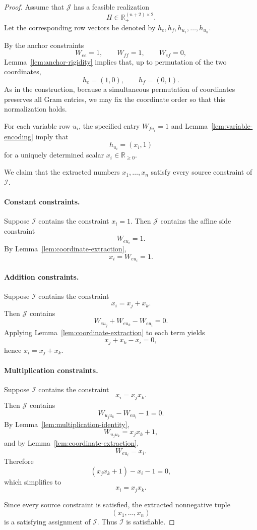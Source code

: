 \documentclass[11pt]{article}
\begin{document}
\begin{proof}
Assume that \(\mathcal{J}\) has a feasible realization
\[
H \in \mathbb{R}_+^{(n+2)\times 2}.
\]
Let the corresponding row vectors be denoted by
\(h_e,h_f,h_{u_1},\dots,h_{u_n}\).

By the anchor constraints
\[
W_{ee}=1,\qquad W_{ff}=1,\qquad W_{ef}=0,
\]
Lemma~\ref{lem:anchor-rigidity} implies that, up to permutation of the two
coordinates,
\[
h_e=(1,0),\qquad h_f=(0,1).
\]
As in the construction, because a simultaneous permutation of coordinates
preserves all Gram entries, we may fix the coordinate order so that this
normalization holds.

For each variable row \(u_i\), the specified entry \(W_{f u_i}=1\) and
Lemma~\ref{lem:variable-encoding} imply that
\[
h_{u_i}=(x_i,1)
\]
for a uniquely determined scalar \(x_i\in\mathbb{R}_{\ge 0}\).

We claim that the extracted numbers \(x_1,\dots,x_n\) satisfy every source
constraint of \(\mathcal{I}\).

\paragraph{Constant constraints.}
Suppose \(\mathcal{I}\) contains the constraint \(x_i=1\). Then \(\mathcal{J}\)
contains the affine side constraint
\[
W_{e u_i}=1.
\]
By Lemma~\ref{lem:coordinate-extraction},
\[
x_i=W_{e u_i}=1.
\]

\paragraph{Addition constraints.}
Suppose \(\mathcal{I}\) contains the constraint
\[
x_i=x_j+x_k.
\]
Then \(\mathcal{J}\) contains
\[
W_{e u_j}+W_{e u_k}-W_{e u_i}=0.
\]
Applying Lemma~\ref{lem:coordinate-extraction} to each term yields
\[
x_j+x_k-x_i=0,
\]
hence \(x_i=x_j+x_k\).

\paragraph{Multiplication constraints.}
Suppose \(\mathcal{I}\) contains the constraint
\[
x_i=x_jx_k.
\]
Then \(\mathcal{J}\) contains
\[
W_{u_j u_k}-W_{e u_i}-1=0.
\]
By Lemma~\ref{lem:multiplication-identity},
\[
W_{u_j u_k}=x_jx_k+1,
\]
and by Lemma~\ref{lem:coordinate-extraction},
\[
W_{e u_i}=x_i.
\]
Therefore
\[
(x_jx_k+1)-x_i-1=0,
\]
which simplifies to
\[
x_i=x_jx_k.
\]

Since every source constraint is satisfied, the extracted nonnegative tuple
\[
(x_1,\dots,x_n)
\]
is a satisfying assignment of \(\mathcal{I}\). Thus \(\mathcal{I}\) is
satisfiable.
\end{proof}
\end{document}
